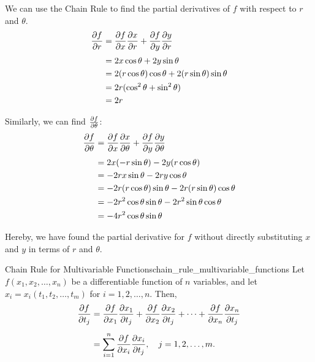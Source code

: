 \begin{sol}
We can use the Chain Rule to find the partial derivatives of $f$ with respect to $r$ and $\theta$.
\begin{align*}
    \pdv{f}{r} &= \pdv{f}{x} \pdv{x}{r} + \pdv{f}{y} \pdv{y}{r} \\[0.2em]
    &= 2x \cos \theta + 2y \sin \theta \\
    &= 2(r \cos \theta) \cos \theta + 2(r \sin \theta) \sin \theta \\
    &= 2r(\cos^2 \theta + \sin^2 \theta) \\
    &= 2r
\end{align*}

Similarly, we can find $\pdv{f}{\theta}$:
\begin{align*}
    \pdv{f}{\theta} &= \pdv{f}{x} \pdv{x}{\theta} + \pdv{f}{y} \pdv{y}{\theta} \\[0.2em]
    &= 2x(-r \sin \theta) - 2y(r \cos \theta) \\
    &= -2r x \sin \theta - 2r y \cos \theta \\
    &= -2r (r \cos \theta) \sin \theta - 2r (r \sin \theta) \cos \theta \\
    &= -2r^2 \cos \theta \sin \theta - 2r^2 \sin \theta \cos \theta \\
    &= -4r^2 \cos \theta \sin \theta
\end{align*}

Hereby, we have found the partial derivative for $f$ without directly substituting $x$ and $y$ in terms of $r$ and $\theta$.
\end{sol}

\begin{theorem}{Chain Rule for Multivariable Functions}{chain_rule_multivariable_functions}
Let $f(x_1, x_2, \ldots, x_n)$ be a differentiable function of $n$ variables,
and let $x_i = x_i(t_1, t_2, \ldots, t_m)$ for $i = 1, 2, \ldots, n$. Then,
\begin{align*}
    \pdv{f}{t_j} &= \pdv{f}{x_1} \pdv{x_1}{t_j} + \pdv{f}{x_2} \pdv{x_2}{t_j} + \cdots + \pdv{f}{x_n} \pdv{x_n}{t_j} \\[0.5em]
    &= \sum_{i=1}^n \pdv{f}{x_i} \pdv{x_i}{t_j}, \quad j = 1, 2, \ldots, m.
\end{align*}
\end{theorem}